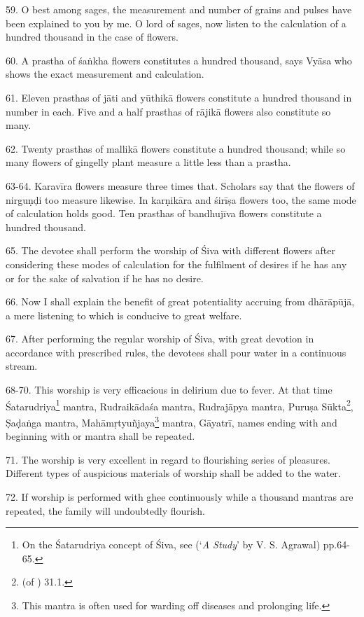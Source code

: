 59. O best among sages, the measurement and number of grains and pulses have
been explained to you by me. O lord of sages, now listen to the calculation of
a hundred thousand in the case of flowers.

60. A prastha of śaṅkha flowers constitutes a hundred thousand, says Vyāsa who
shows the exact measurement and calculation.

61. Eleven prasthas of jāti and yūthikā flowers constitute a hundred thousand in
number in each. Five and a half prasthas of rājikā flowers also constitute so
many.

62. Twenty prasthas of mallikā flowers constitute a hundred thousand; while so
many flowers of gingelly plant measure a little less than a prastha.

63-64. Karavīra flowers measure three times that. Scholars say that the flowers
of nirguṇḍi too measure likewise. In karṇikāra and śirīṣa flowers too, the same
mode of calculation holds good. Ten prasthas of bandhujīva flowers constitute
a hundred thousand.

65. The devotee shall perform the worship of Śiva with different flowers after
considering these modes of calculation for the fulfilment of desires if he has
any or for the sake of salvation if he has no desire.

66. Now I shall explain the benefit of great potentiality accruing from
dhārāpūjā, a mere listening to which is conducive to great welfare.

67. After performing the regular worship of Śiva, with great devotion in
accordance with prescribed rules, the devotees shall pour water in a continuous
stream.

68-70. This  worship is very efficacious in delirium due to fever. At
that time Śatarudriya\footnote{On the Śatarudriya concept of Śiva, see
 (‘\emph{A Study}’ by V. S. Agrawal) pp.64-65.} mantra,
Rudraikādaśa mantra, Rudrajāpya mantra, Puruṣa Sūkta\footnote{
 (of ) 31.1.}, Ṣaḍaṅga mantra,
Mahāmṛtyuñjaya\footnote{This mantra is often used for warding off diseases and
prolonging life.} mantra, Gāyatrī, names ending with  and beginning
with  or  mantra shall be repeated.

71. The  worship is very excellent in regard to flourishing series of
pleasures. Different types of auspicious materials of worship shall be added to
the water.

72. If  worship is performed with ghee continuously while a thousand
mantras are repeated, the family will undoubtedly flourish.


